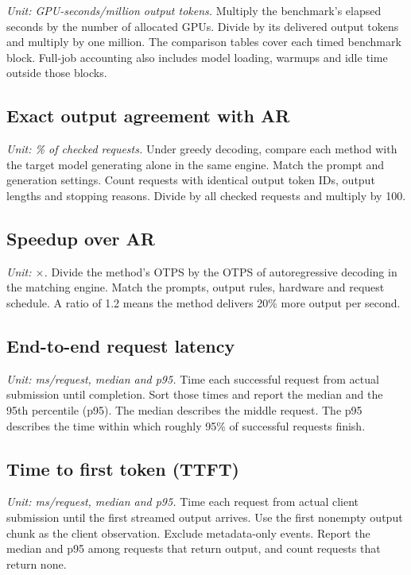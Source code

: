\documentclass[conference,onecolumn]{IEEEtran}
\begin{document}
\textit{Unit: GPU-seconds/million output tokens.} Multiply the benchmark's elapsed seconds by the number of allocated GPUs. Divide by its delivered output tokens and multiply by one million. The comparison tables cover each timed benchmark block. Full-job accounting also includes model loading, warmups and idle time outside those blocks.

\subsection{Exact output agreement with AR}

\textit{Unit: \% of checked requests.} Under greedy decoding, compare each method with the target model generating alone in the same engine. Match the prompt and generation settings. Count requests with identical output token IDs, output lengths and stopping reasons. Divide by all checked requests and multiply by 100.

\subsection{Speedup over AR}

\textit{Unit: \(\times\).} Divide the method's OTPS by the OTPS of autoregressive decoding in the matching engine. Match the prompts, output rules, hardware and request schedule. A ratio of 1.2 means the method delivers 20\% more output per second.

\subsection{End-to-end request latency}

\textit{Unit: ms/request, median and p95.} Time each successful request from actual submission until completion. Sort those times and report the median and the 95th percentile (p95). The median describes the middle request. The p95 describes the time within which roughly 95\% of successful requests finish.

\subsection{Time to first token (TTFT)}

\textit{Unit: ms/request, median and p95.} Time each request from actual client submission until the first streamed output arrives. Use the first nonempty output chunk as the client observation. Exclude metadata-only events. Report the median and p95 among requests that return output, and count requests that return none.
\end{document}
